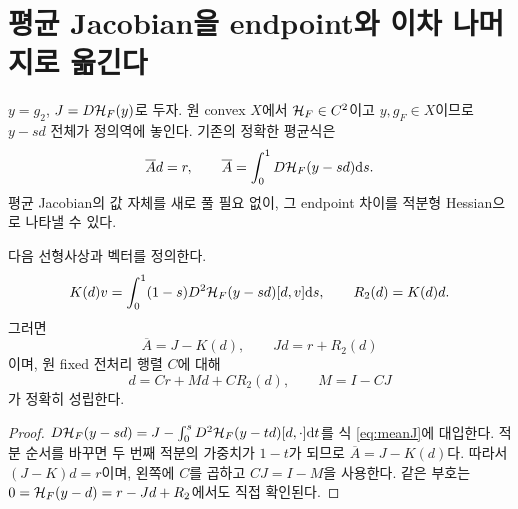 \section{평균 Jacobian을 endpoint와 이차 나머지로 옮긴다}\label{sec:endpoint}
$y=g_2$, $J=D\mathcal H_F(y)$로 두자. 원 convex $X$에서 $\mathcal H_F\in C^2$이고 $y,g_F\in X$이므로 $y-sd$ 전체가 정의역에 놓인다. 기존의 정확한 평균식은
\begin{equation}
\overline A d=r,\qquad
\overline A=\int_0^1D\mathcal H_F(y-sd)\mathrm d s.
\label{eq:meanJ}
\end{equation}
평균 Jacobian의 값 자체를 새로 풀 필요 없이, 그 endpoint 차이를 적분형 Hessian으로 나타낼 수 있다.\cite{endpoint16}

\begin{theorem}\label{thm:K}
다음 선형사상과 벡터를 정의한다.
\begin{equation}
K(d)v=\int_0^1(1-s)D^2\mathcal H_F(y-sd)[d,v]\mathrm d s,
\qquad R_2(d)=K(d)d.
\label{eq:K}
\end{equation}
그러면
\begin{equation}
\boxed{\overline A=J-K(d),\qquad Jd=r+R_2(d)}
\label{eq:JK}
\end{equation}
이며, 원 fixed 전처리 행렬 $C$에 대해
\begin{equation}
\boxed{d=Cr+Md+CR_2(d),\qquad M=I-CJ}
\label{eq:transfer}
\end{equation}
가 정확히 성립한다.
\end{theorem}
\begin{proof}
$D\mathcal H_F(y-sd)=J-\int_0^sD^2\mathcal H_F(y-td)[d,\cdot]\mathrm d t$를 식 \eqref{eq:meanJ}에 대입한다. 적분 순서를 바꾸면 두 번째 적분의 가중치가 $1-t$가 되므로 $\overline A=J-K(d)$다. 따라서 $(J-K)d=r$이며, 왼쪽에 $C$를 곱하고 $CJ=I-M$을 사용한다. 같은 부호는 $0=\mathcal H_F(y-d)=r-Jd+R_2$에서도 직접 확인된다.
\end{proof}

